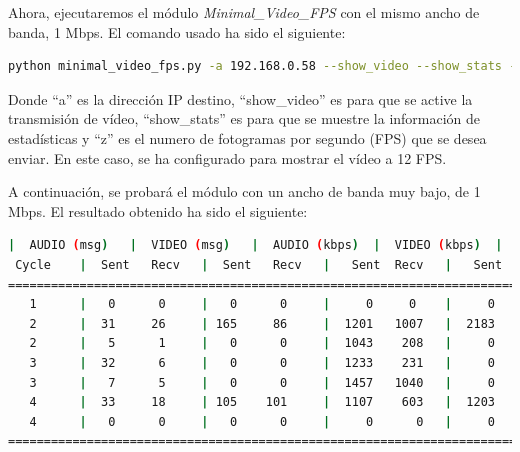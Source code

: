 \newpage

\vspace{\baselineskip}

Ahora, ejecutaremos el módulo \textit{Minimal\_Video\_FPS} con el mismo ancho de banda, 1 Mbps. El comando usado ha sido el siguiente:

\begin{lstlisting}[language=bash, basicstyle=\ttfamily\scriptsize]
    python minimal_video_fps.py -a 192.168.0.58 --show_video --show_stats -z 12
\end{lstlisting}

Donde ``a'' es la dirección IP destino, ``show\_video'' es para que se active la transmisión de vídeo, ``show\_stats'' es para que se muestre la información de estadísticas y ``z'' es el numero de fotogramas por segundo (FPS) que se desea enviar. En este caso, se ha configurado para mostrar el vídeo a 12 FPS.

A continuación, se probará el módulo con un ancho de banda muy bajo, de 1 Mbps. El resultado obtenido ha sido el siguiente:
\vspace{\baselineskip}

\begin{lstlisting}[language=bash,basicstyle=\ttfamily\scriptsize]
          |  AUDIO (msg)   |  VIDEO (msg)   |  AUDIO (kbps)  |  VIDEO (kbps)  |   CPU (%)
 Cycle    |  Sent   Recv   |  Sent   Recv   |   Sent  Recv   |   Sent  Recv   | Program System
============================================================================================
   1      |   0      0     |   0      0     |     0     0    |     0     0    |   0      0
   2      |  31     26     | 165     86     |  1201   1007   |  2183   1139   |   8     63
   2      |   5      1     |   0      0     |  1043    208   |     0      0   |  31     62
   3      |  32      6     |   0      0     |  1233    231   |     0      0   |  41     75
   3      |   7      5     |   0      0     |  1457   1040   |     0      0   |  44     75
   4      |  33     18     | 105    101     |  1107    603   |  1203   1155   |  32     74
   4      |   0      0     |   0      0     |     0      0   |     0      0   |  33     73
============================================================================================
\end{lstlisting}

